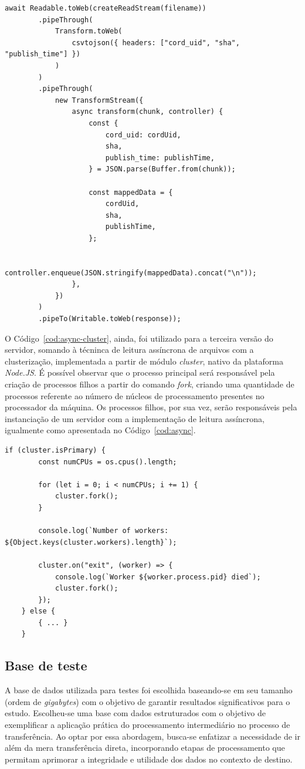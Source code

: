 \documentclass[12pt]{article}
\begin{document}
\begin{lstlisting}[caption={Implementação da leitura do arquivo de forma assíncrona}, label=cod:async]
	await Readable.toWeb(createReadStream(filename))
		.pipeThrough(
			Transform.toWeb(
				csvtojson({ headers: ["cord_uid", "sha", "publish_time"] })
			)
		)
		.pipeThrough(
			new TransformStream({
				async transform(chunk, controller) {
					const {
						cord_uid: cordUid,
						sha,
						publish_time: publishTime,
					} = JSON.parse(Buffer.from(chunk));

					const mappedData = {
						cordUid,
						sha,
						publishTime,
					};

					controller.enqueue(JSON.stringify(mappedData).concat("\n"));
				},
			})
		)
		.pipeTo(Writable.toWeb(response));
\end{lstlisting}

O Código~\ref{cod:async-cluster}, ainda, foi utilizado para a terceira versão do servidor, somando à técninca de leitura
assíncrona de arquivos com a clusterização, implementada a partir de módulo \textit{cluster}, nativo da plataforma
\textit{Node.JS}. É possível observar que o processo principal será responsável pela criação de processos filhos a partir
do comando \textit{fork}, criando uma quantidade de processos referente ao número de núcleos de processamento presentes
no processador da máquina. Os processos filhos, por sua vez, serão responsáveis pela instanciação de um servidor com 
a implementação de leitura assíncrona, igualmente como apresentada no Código~\ref{cod:async}.

\begin{lstlisting}[caption={Implementação da técnica de clusterização}, label=cod:async-cluster]
	if (cluster.isPrimary) {
		const numCPUs = os.cpus().length;

		for (let i = 0; i < numCPUs; i += 1) {
			cluster.fork();
		}

		console.log(`Number of workers: ${Object.keys(cluster.workers).length}`);

		cluster.on("exit", (worker) => {
			console.log(`Worker ${worker.process.pid} died`);
			cluster.fork();
		});
	} else {
		{ ... }
	}
\end{lstlisting}


\subsection{Base de teste}

A base de dados utilizada para testes foi escolhida baseando-se em seu tamanho (ordem de \textit{gigabytes}) com
o objetivo de garantir resultados significativos para o estudo. Escolheu-se uma base com dados estruturados com o 
objetivo de exemplificar a aplicação prática do processamento intermediário no processo de transferência. 
Ao optar por essa abordagem, busca-se enfatizar a necessidade de ir além da mera transferência direta, 
incorporando etapas de processamento que permitam aprimorar a integridade e utilidade dos dados no contexto de destino.
\end{document}
